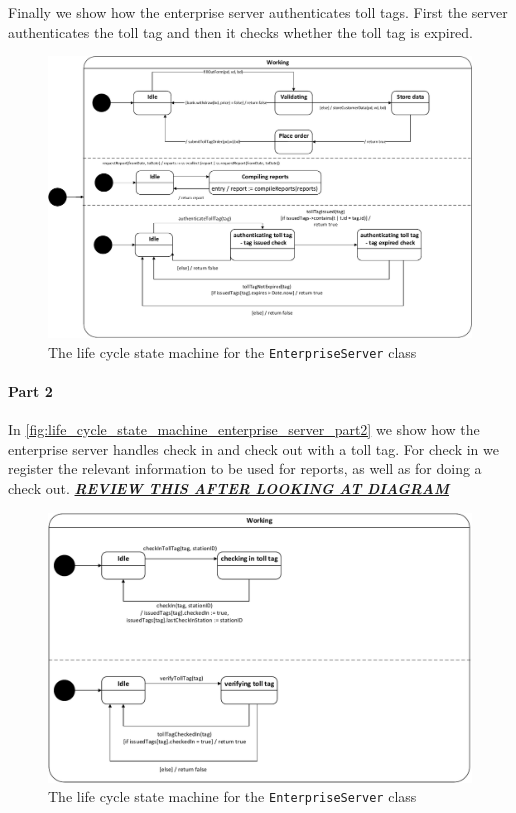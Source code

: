 Finally we show how the enterprise server authenticates toll tags. First the server authenticates the toll tag and then it checks  whether the toll tag is expired.

\begin{figure}[H]
\centering
\includegraphics[width=0.7\linewidth]{img/behaviour_state_machines/life_cycle_state_machines/life_cycle_state_machine_enterprise_server}
\caption{The life cycle state machine for the \texttt{EnterpriseServer} class}
\label{fig:life_cycle_state_machine_enterprise_server}
\end{figure}

\paragraph*{Part 2} In \autoref{fig:life_cycle_state_machine_enterprise_server_part2} we show how the enterprise server handles check in and check out with a toll tag. For check in we register the relevant information to be used for reports, as well as for doing a check out. \textit{\textbf{\underline{REVIEW THIS AFTER LOOKING AT DIAGRAM}}}

\begin{figure}[H]
\centering
\includegraphics[width=0.7\linewidth]{img/behaviour_state_machines/life_cycle_state_machines/life_cycle_state_machine_enterprise_server_part2}
\caption{The life cycle state machine for the \texttt{EnterpriseServer} class}
\label{fig:life_cycle_state_machine_enterprise_server_part2}
\end{figure}

